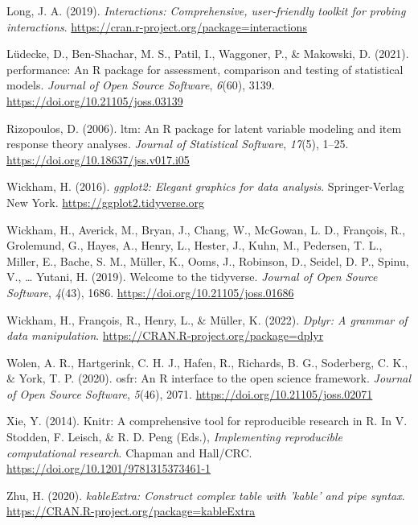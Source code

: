 \documentclass[
  bookmarksnumbered]{article}
\newlength{\cslhangindent}
\newlength{\cslentryspacingunit} %
\newenvironment{CSLReferences}[2] %
 {%
  \setlength{\parindent}{0pt}
  \ifodd #1
  \let\oldpar\par
  \def\par{\hangindent=\cslhangindent\oldpar}
  \fi
  \setlength{\parskip}{#2\cslentryspacingunit}
 }%
 {}
\begin{document}
\begin{CSLReferences}{1}{0}
\leavevmode{}%
Long, J. A. (2019). \emph{Interactions: Comprehensive, user-friendly toolkit for probing interactions}. \url{https://cran.r-project.org/package=interactions}

\leavevmode{}%
Lüdecke, D., Ben-Shachar, M. S., Patil, I., Waggoner, P., \& Makowski, D. (2021). {performance}: An {R} package for assessment, comparison and testing of statistical models. \emph{Journal of Open Source Software}, \emph{6}(60), 3139. \url{https://doi.org/10.21105/joss.03139}

\leavevmode{}%
Rizopoulos, D. (2006). {ltm}: An {R} package for latent variable modeling and item response theory analyses. \emph{Journal of Statistical Software}, \emph{17}(5), 1--25. \url{https://doi.org/10.18637/jss.v017.i05}

\leavevmode{}%
Wickham, H. (2016). \emph{ggplot2: Elegant graphics for data analysis}. Springer-Verlag New York. \url{https://ggplot2.tidyverse.org}

\leavevmode{}%
Wickham, H., Averick, M., Bryan, J., Chang, W., McGowan, L. D., François, R., Grolemund, G., Hayes, A., Henry, L., Hester, J., Kuhn, M., Pedersen, T. L., Miller, E., Bache, S. M., Müller, K., Ooms, J., Robinson, D., Seidel, D. P., Spinu, V., \ldots{} Yutani, H. (2019). Welcome to the {tidyverse}. \emph{Journal of Open Source Software}, \emph{4}(43), 1686. \url{https://doi.org/10.21105/joss.01686}

\leavevmode{}%
Wickham, H., François, R., Henry, L., \& Müller, K. (2022). \emph{Dplyr: A grammar of data manipulation}. \url{https://CRAN.R-project.org/package=dplyr}

\leavevmode{}%
Wolen, A. R., Hartgerink, C. H. J., Hafen, R., Richards, B. G., Soderberg, C. K., \& York, T. P. (2020). {osfr}: An {R} interface to the open science framework. \emph{Journal of Open Source Software}, \emph{5}(46), 2071. \url{https://doi.org/10.21105/joss.02071}

\leavevmode{}%
Xie, Y. (2014). Knitr: A comprehensive tool for reproducible research in {R}. In V. Stodden, F. Leisch, \& R. D. Peng (Eds.), \emph{Implementing reproducible computational research}. {Chapman and Hall/CRC}. \url{https://doi.org/10.1201/9781315373461-1}

\leavevmode{}%
Zhu, H. (2020). \emph{kableExtra: Construct complex table with 'kable' and pipe syntax}. \url{https://CRAN.R-project.org/package=kableExtra}

\end{CSLReferences}
\end{document}
